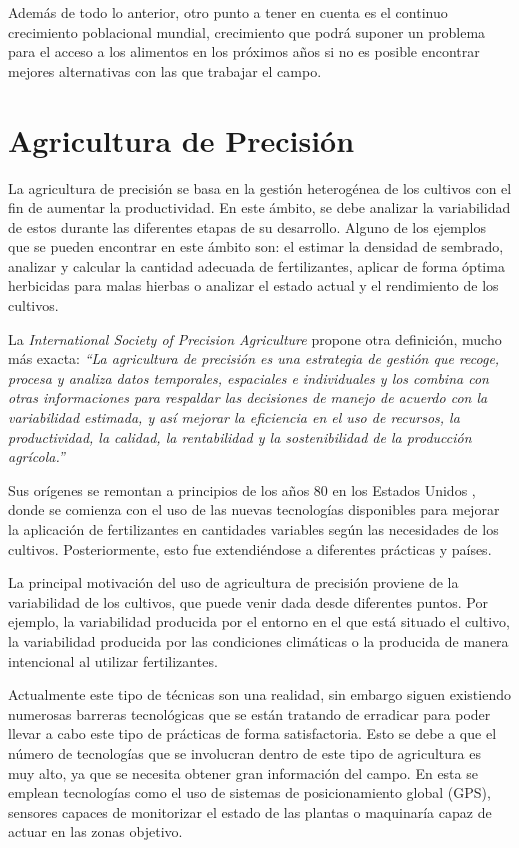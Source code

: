 Además de todo lo anterior, otro punto a tener en cuenta es el continuo crecimiento poblacional mundial, crecimiento que podrá suponer un problema para el acceso a los alimentos en los próximos años si no es posible encontrar mejores alternativas con las que trabajar el campo.

\section{Agricultura de Precisión}

La agricultura de precisión se basa en la gestión heterogénea de los cultivos con el fin de aumentar la productividad. En este ámbito, se debe analizar la variabilidad de estos durante las diferentes etapas de su desarrollo. Alguno de los ejemplos que se pueden encontrar en este ámbito son: el estimar la densidad de sembrado, analizar y calcular la cantidad adecuada de fertilizantes, aplicar de forma óptima herbicidas para malas hierbas o analizar el estado actual y el rendimiento de los cultivos.

La \textit{International Society of Precision Agriculture} propone otra definición, mucho más exacta: \textit{``La agricultura de precisión es una estrategia de gestión que recoge, procesa y analiza datos temporales, espaciales e individuales y los combina con otras informaciones para respaldar las decisiones de manejo de acuerdo con la variabilidad estimada, y así mejorar la eficiencia en el uso de recursos, la productividad, la calidad, la rentabilidad y la sostenibilidad de la producción agrícola.''} \cite{ispa}

Sus orígenes se remontan a principios de los años 80 en los Estados Unidos \cite{Robert2002}, donde se comienza con el uso de las nuevas tecnologías disponibles para mejorar la aplicación de fertilizantes en cantidades variables según las necesidades de los cultivos. Posteriormente, esto fue extendiéndose a diferentes prácticas y países. 

La principal motivación del uso de agricultura de precisión proviene de la variabilidad de los cultivos, que puede venir dada desde diferentes puntos. Por ejemplo, la variabilidad producida por el entorno en el que está situado el cultivo, la variabilidad producida por las condiciones climáticas o la producida de manera intencional al utilizar fertilizantes.

Actualmente este tipo de técnicas son una realidad, sin embargo siguen existiendo numerosas barreras tecnológicas que se están tratando de erradicar para poder llevar a cabo este tipo de prácticas de forma satisfactoria. Esto se debe a que el número de tecnologías que se involucran dentro de este tipo de agricultura es muy alto, ya que se necesita obtener gran información del campo. En esta se emplean tecnologías como el uso de sistemas de posicionamiento global (GPS), sensores capaces de monitorizar el estado de las plantas o maquinaría capaz de actuar en las zonas objetivo. \cite{Garcia2008}

